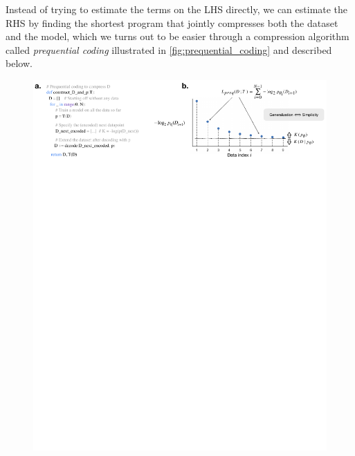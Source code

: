 \documentclass{article}
\begin{document}
\begin{appendices}
Instead of trying to estimate the terms on the LHS directly, we can estimate the RHS by finding the shortest program that jointly compresses both the dataset and the model, which we turns out to be easier through a compression algorithm called \textit{prequential coding} illustrated in \cref{fig:prequential_coding} and described below.

\begin{figure}[ht]
    \centering
    \includegraphics[width=\linewidth]{figures/prequential_coding.pdf}

\end{figure}
\end{appendices}
\end{document}
